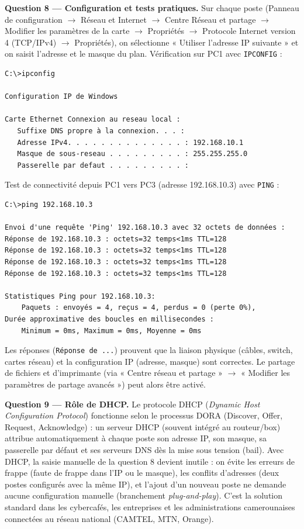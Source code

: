 \documentclass[11pt]{article}
\newcommand{\cle}[1]{{\popxbold\color{popdark}#1}}
\begin{document}
\begin{exoresolu}
\textbf{Question 8 — Configuration et tests pratiques.} Sur chaque poste (Panneau de configuration $\rightarrow$ Réseau et Internet $\rightarrow$ Centre Réseau et partage $\rightarrow$ Modifier les paramètres de la carte $\rightarrow$ Propriétés $\rightarrow$ Protocole Internet version 4 (TCP/IPv4) $\rightarrow$ Propriétés), on sélectionne « Utiliser l'adresse IP suivante » et on saisit l'adresse et le masque du plan. Vérification sur PC1 avec \texttt{IPCONFIG} :

\begin{lstlisting}
C:\>ipconfig

Configuration IP de Windows

Carte Ethernet Connexion au reseau local :
   Suffixe DNS propre à la connexion. . . :
   Adresse IPv4. . . . . . . . . . . . . . : 192.168.10.1
   Masque de sous-reseau . . . . . . . . . : 255.255.255.0
   Passerelle par defaut . . . . . . . . . :
\end{lstlisting}

Test de connectivité depuis PC1 vers PC3 (adresse 192.168.10.3) avec \texttt{PING} :

\begin{lstlisting}
C:\>ping 192.168.10.3

Envoi d'une requête 'Ping' 192.168.10.3 avec 32 octets de données :
Réponse de 192.168.10.3 : octets=32 temps<1ms TTL=128
Réponse de 192.168.10.3 : octets=32 temps<1ms TTL=128
Réponse de 192.168.10.3 : octets=32 temps<1ms TTL=128
Réponse de 192.168.10.3 : octets=32 temps<1ms TTL=128

Statistiques Ping pour 192.168.10.3:
    Paquets : envoyés = 4, reçus = 4, perdus = 0 (perte 0%),
Durée approximative des boucles en millisecondes :
    Minimum = 0ms, Maximum = 0ms, Moyenne = 0ms
\end{lstlisting}

Les réponses (\texttt{Réponse de ...}) prouvent que la liaison physique (câbles, switch, cartes réseau) et la configuration IP (adresse, masque) sont correctes. Le partage de fichiers et d'imprimante (via « Centre réseau et partage » $\rightarrow$ « Modifier les paramètres de partage avancés ») peut alors être activé.

\textbf{Question 9 — Rôle de DHCP.} Le protocole \cle{DHCP} (\emph{Dynamic Host Configuration Protocol}) fonctionne selon le processus DORA (Discover, Offer, Request, Acknowledge) : un serveur DHCP (souvent intégré au routeur/box) attribue automatiquement à chaque poste son adresse IP, son masque, sa passerelle par défaut et ses serveurs DNS dès la mise sous tension (bail). Avec DHCP, la saisie manuelle de la question 8 devient inutile : on évite les erreurs de frappe (faute de frappe dans l'IP ou le masque), les conflits d'adresses (deux postes configurés avec la même IP), et l'ajout d'un nouveau poste ne demande aucune configuration manuelle (branchement \emph{plug-and-play}). C'est la solution standard dans les cybercafés, les entreprises et les administrations camerounaises connectées au réseau national (CAMTEL, MTN, Orange).
\end{exoresolu}
\end{document}
